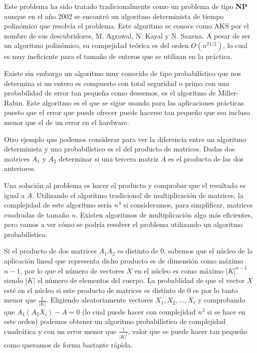 Este problema ha sido tratado tradicionalmente como un problema de tipo \textbf{NP} aunque en el a\~no 2002 se encontr\'o un algoritmo determinista de tiempo polin\'omico que resolv\'ia el problema. Este algoritmo se conoce como AKS por el nombre de sus descubridores, M. Agrawal, N. Kayal y N. Saxena. A pesar de ser un algoritmo polin\'omico, su compejidad te\'orica es del orden $O(n^{21/2})$, lo cual es muy ineficiente para el tama\~no de enteros que se utilizan en la
pr\'actica.

Existe sin embargo un algoritmo muy conocido de tipo probabil\'istico que nos determina si un entero es compuesto con total seguridad o primo con una probabilidad de error tan peque\~na como deseemos, es el algoritmo de Miller-Rabin. Este algoritmo es el que se sigue usando para las aplicaciones pr\'acticas puesto que el error que puede ofrecer puede hacerse tan peque\~no que sea incluso menor que el de un error en el hardware.

Otro ejemplo que podemos considerar para ver la diferencia entre un algoritmo determinista y uno probabil\'istico es el del producto de matrices. Dadas dos matrices $A_1$ y $A_2$ determinar si una tercera matriz $A$ es el producto de las dos anteriores.

Una soluci\'on al problema es hacer el producto y comprobar que el resultado es igual a $A$. Utilizando el algoritmo tradicional de multiplicaci\'on de matrices, la complejidad de este algoritmo ser\'ia $n^3$ si consideramos, para simplificar, matrices cuadradas de tama\~no $n$.  Existen algoritmos de multiplicaci\'on algo m\'as eficientes, pero vamos a ver c\'omo se podr\'ia resolver el problema utilizando un algoritmo probabil\'istico.

Si el producto de dos matrices $A_1 A_2$ es distinto de $0$, sabemos que el n\'ucleo de la aplicaci\'on lineal que representa dicho producto es de dimensi\'on como m\'aximo $n-1$, por lo que el n\'umero de vectores $X$ en el n\'ucleo es como m\'aximo $|K|^{n-1}$ siendo $|K|$ el n\'umero de elementos del cuerpo. La probablidad de que el vector $X$ est\'e en el n\'ucleo si este producto de matrices es distinto de $0$ es por lo tanto menor que $\frac{1}{|K|}$. Eligiendo aleatoriamente vectores $X_1, X_2, ..., X_t$ y comprobando que $A_1 (A_2 X_i)-A=0$ (lo cual puede hacer con complejidad $n^2$ si se hace en este orden) podemos obtener un algoritmo probabil\'istico de complejidad cuadr\'atica y con un error menor que $\frac{1}{|K|^t}$, valor que se puede hacer tan peque\~no como queramos de forma bastante r\'apida.
